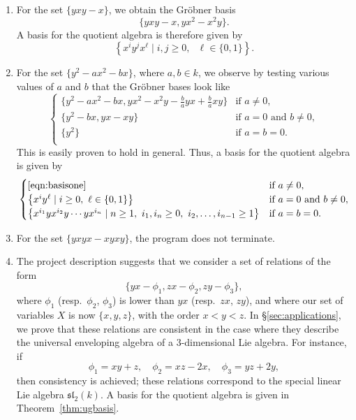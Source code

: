 \begin{enumerate}
	\item For the set $\{yxy-x\}$, we obtain the Gr\"obner basis
	\begin{equation*}
		\{yxy-x,yx^2-x^2y\}.
	\end{equation*}
    A basis for the quotient algebra is therefore given by
    \begin{equation*}
      \left\{x^iy^jx^\ell\mid i,j\ge 0,\text{ }\ell\in\{0,1\}\right\}.
    \end{equation*}
	\item For the set $\{y^2-ax^2-bx\}$, where $a,b\in k$, we observe by testing various values of $a$ and $b$ that the Gr\"obner bases look like
      \begin{equation*}
\begin{cases}
\{y^2-ax^2-bx,yx^2-x^2y-\frac{b}{a}yx+\frac{b}{a}xy\}&\text{if }a\ne 0,\\
\{y^2-bx,yx-xy\}&\text{if }a=0\text{ and }b\ne 0,\\
\{y^2\}&\text{if }a=b=0.\\
\end{cases}
        \end{equation*}
      This is easily proven to hold in general. Thus, a basis for the quotient algebra is given by
      \begin{equation*}
\begin{cases}
\eqref{eqn:basisone}&\text{if }a\ne 0,\\
\left\{x^iy^\ell\mid i\ge 0,\text{ }\ell\in\{0,1\}\right\}&\text{if }a=0\text{ and }b\ne 0,\\
\left\{x^{i_1}yx^{i_2}y\cdots yx^{i_n}\mid n\ge 1,\text{ }i_1,i_n\ge 0,\text{ }i_2,\ldots,i_{n-1}\ge 1\right\}&\text{if }a=b=0.\\
\end{cases}
      \end{equation*}
	\item For the set $\{yxyx-xyxy\}$, the program does not terminate.
    \item The project description suggests that we consider a set of relations of the form
\begin{equation*}
\{yx-\phi_1,zx-\phi_2,zy-\phi_3\},
\end{equation*}
where $\phi_1$ (resp.\ $\phi_2$, $\phi_3$) is lower than $yx$ (resp.\ $zx$, $zy$), and where our set of variables $X$ is now $\{x,y,z\}$, with the order $x<y<z$. In \S\ref{sec:applications}, we prove that these relations are consistent in the case where they describe the universal enveloping algebra of a $3$-dimensional Lie algebra. For instance, if
\begin{equation*}
\phi_1=xy+z,\quad\phi_2=xz-2x,\quad\phi_3=yz+2y,
\end{equation*}
then consistency is achieved; these relations correspond to the special linear Lie algebra $\mathfrak{sl}_2(k)$. A basis for the quotient algebra is given in Theorem~\ref{thm:ugbasis}.
\end{enumerate}

